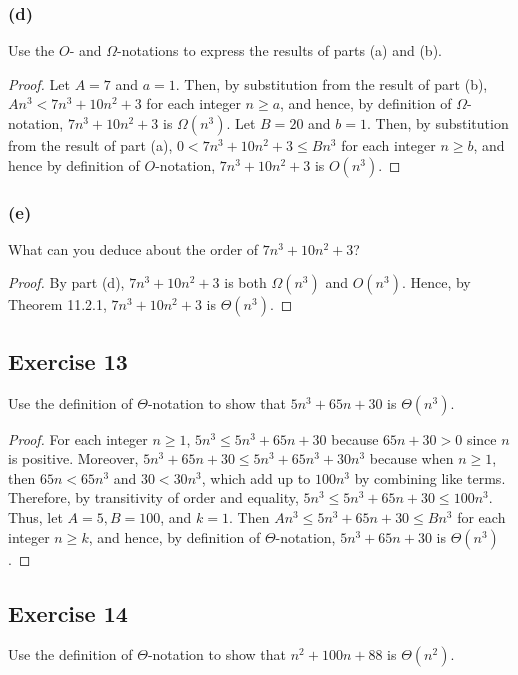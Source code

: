 \documentclass[14pt]{extarticle}
\begin{document}
\subsubsection{(d)}
Use the \(O\)- and \(\Omega\)-notations to express the results of parts (a) and (b).

\begin{proof}
    Let \(A = 7\) and \(a = 1\). Then, by substitution from the result of part (b), \(An^3 < 7n^3 + 10n^2 + 3\) for each
    integer \(n \geq a\), and hence, by definition of \(\Omega\)-notation, \(7n^3 + 10n^2 + 3\) is \(\Omega(n^3)\). Let
    \(B = 20\) and \(b = 1\). Then, by substitution from the result of part (a), \(0 < 7n^3 + 10n^2 + 3 \leq Bn^3\) for
    each integer \(n \geq b\), and hence by definition of \(O\)-notation, \(7n^3 + 10n^2 + 3\) is \(O(n^3)\).
\end{proof}

\subsubsection{(e)}
What can you deduce about the order of \(7n^3 + 10n^2 + 3\)?
\begin{proof}
    By part (d), \(7n^3 + 10n^2 + 3\) is both \(\Omega(n^3)\) and \(O(n^3)\). Hence, by Theorem 11.2.1, \(7n^3 + 10n^2 + 3\) is
    \(\Theta(n^3)\).
\end{proof}

\subsection{Exercise 13}
Use the definition of \(\Theta\)-notation to show that \(5n^3 + 65n + 30\) is \(\Theta(n^3)\).

\begin{proof}
    For each integer \(n \geq 1\), \(5n^3 \leq 5n^3 + 65n + 30\) because \(65n + 30 > 0\) since \(n\) is positive. Moreover,
    \(5n^3 + 65n + 30 \leq 5n^3 + 65n^3 + 30n^3\) because when \(n \geq 1\), then \(65n < 65n^3\) and \(30 < 30n^3\), which add
    up to \(100n^3\) by combining like terms. Therefore, by transitivity of order and equality, \(5n^3 \leq 5n^3 + 65n +
    30 \leq 100n^3\). Thus, let \(A = 5, B = 100\), and \(k = 1\). Then \(An^3 \leq 5n^3 + 65n + 30 \leq Bn^3\) for each integer
    \(n \geq k\), and hence, by definition of \(\Theta\)-notation, \(5n^3 + 65n + 30\) is \(\Theta(n^3)\).
\end{proof}

\subsection{Exercise 14}
Use the definition of \(\Theta\)-notation to show that \(n^2 + 100n + 88\) is \(\Theta(n^2)\).
\end{document}
